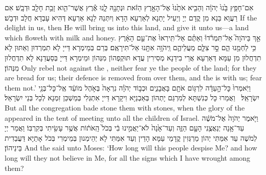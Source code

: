 {אִם־חָפֵ֥ץ בָּ֙נוּ֙ יְהֹוָ֔ה וְהֵבִ֤יא אֹתָ֙נוּ֙ אֶל־הָאָ֣רֶץ הַזֹּ֔את וּנְתָנָ֖הּ לָ֑נוּ אֶ֕רֶץ אֲשֶׁר־הִ֛וא זָבַ֥ת חָלָ֖ב וּדְבָֽשׁ׃}
{אִם רַעֲוָא בַּנָא מִן קֳדָם יְיָ וְיַעֵיל יָתַנָא לְאַרְעָא הָדָא וְיִתְּנַהּ לַנָא אַרְעָא דְּהִיא עָבְדָא חֲלָב וּדְבָשׁ׃}
{If the \lord\space delight in us, then He will bring us into this land, and give it unto us—a land which floweth with milk and honey.}{}
{אַ֣ךְ בַּיהֹוָה֮ אַל־תִּמְרֹ֒דוּ֒ וְאַתֶּ֗ם אַל־תִּֽירְאוּ֙ אֶת־עַ֣ם הָאָ֔רֶץ כִּ֥י לַחְמֵ֖נוּ הֵ֑ם סָ֣ר צִלָּ֧ם מֵעֲלֵיהֶ֛ם וַֽיהֹוָ֥ה אִתָּ֖נוּ אַל־תִּירָאֻֽם׃
}
{בְּרַם בְּמֵימְרָא דַּייָ לָא תִמְרְדוּן וְאַתּוּן לָא תִדְחֲלוּן מִן עַמָּא דְּאַרְעָא אֲרֵי בִידַנָא מְסִירִין עֲדָא תּוּקְפְהוֹן מִנְּהוֹן וּמֵימְרָא דַּייָ בְּסַעֲדַנָא לָא תִדְחֲלוּן מִנְּהוֹן׃}
{Only rebel not against the \lord, neither fear ye the people of the land; for they are bread for us; their defence is removed from over them, and the \lord\space is with us; fear them not.’}{}
{וַיֹּֽאמְרוּ֙ כׇּל־הָ֣עֵדָ֔ה לִרְגּ֥וֹם אֹתָ֖ם בָּאֲבָנִ֑ים וּכְב֣וֹד יְהֹוָ֗ה נִרְאָה֙ בְּאֹ֣הֶל מוֹעֵ֔ד אֶֽל־כׇּל־בְּנֵ֖י יִשְׂרָאֵֽל׃ \petucha 
{}}
{וַאֲמַרוּ כָּל כְּנִשְׁתָּא לְמִרְגַּם יָתְהוֹן בְּאַבְנַיָּא וִיקָרָא דַּייָ אִתְגְּלִי בְּמַשְׁכַּן זִמְנָא לְכָל בְּנֵי יִשְׂרָאֵל׃}
{But all the congregation bade stone them with stones, when the glory of the \lord\space appeared in the tent of meeting unto all the children of Israel.}{}
{וַיֹּ֤אמֶר יְהֹוָה֙ אֶל־מֹשֶׁ֔ה עַד־אָ֥נָה יְנַאֲצֻ֖נִי הָעָ֣ם הַזֶּ֑ה וְעַד־אָ֙נָה֙ לֹא־יַאֲמִ֣ינוּ בִ֔י בְּכֹל֙ הָֽאֹת֔וֹת אֲשֶׁ֥ר עָשִׂ֖יתִי בְּקִרְבּֽוֹ׃
}
{וַאֲמַר יְיָ לְמֹשֶׁה עַד אִמַּתִּי יְהוֹן מַרְגְּזִין קֳדָמַי עַמָּא הָדֵין וְעַד אִמַּתִּי לָא יְהֵימְנוּן בְּמֵימְרִי בְּכֹל אָתַיָּא דַּעֲבַדִית בֵּינֵיהוֹן׃}
{And the \lord\space said unto Moses: ‘How long will this people despise Me? and how long will they not believe in Me, for all the signs which I have wrought among them?}{}
